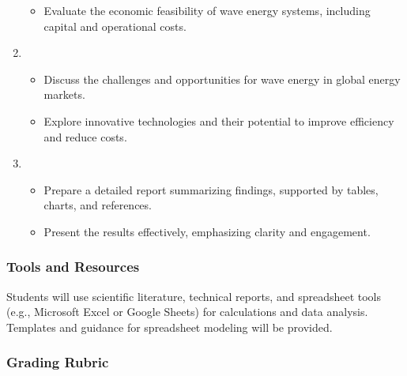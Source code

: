 \documentclass[letterpaper,10pt,english]{jupyterBook}
\begin{document}
\begin{enumerate}
\begin{itemize}
\item {} 
\sphinxAtStartPar
Evaluate the economic feasibility of wave energy systems, including capital and operational costs.

\end{itemize}

\item {} 
\sphinxAtStartPar
{}
\begin{itemize}
\item {} 
\sphinxAtStartPar
Discuss the challenges and opportunities for wave energy in global energy markets.

\item {} 
\sphinxAtStartPar
Explore innovative technologies and their potential to improve efficiency and reduce costs.

\end{itemize}

\item {} 
\sphinxAtStartPar
{}
\begin{itemize}
\item {} 
\sphinxAtStartPar
Prepare a detailed report summarizing findings, supported by tables, charts, and references.

\item {} 
\sphinxAtStartPar
Present the results effectively, emphasizing clarity and engagement.

\end{itemize}

\end{enumerate}


\subsubsection{Tools and Resources}
\label{\detokenize{ProjectSyllabus:id30}}
\sphinxAtStartPar
Students will use scientific literature, technical reports, and spreadsheet tools (e.g., Microsoft Excel or Google Sheets) for calculations and data analysis. Templates and guidance for spreadsheet modeling will be provided.


\subsubsection{Grading Rubric}
\label{\detokenize{ProjectSyllabus:id31}}
\end{document}
